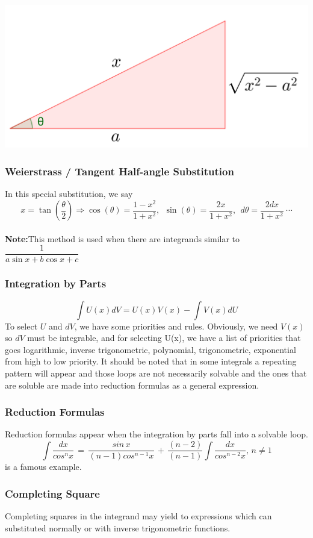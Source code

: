 \documentclass[12pt]{article}
\begin{document}
\begin{enumerate}
\includegraphics[scale=0.15]{asec_subs.png}
\end{enumerate}
\subsubsection{Weierstrass / Tangent Half-angle Substitution}
In this special substitution, we say $$x = \tan \left(\frac{\theta}{2}\right) \Rightarrow \cos (\theta )=\frac{1-x^2}{1+x^2} ,\ \  \sin (\theta ) = \frac{2x}{1+x^2} , \ \ d\theta = \frac{2dx}{1+x^2}\ \cdots$$ \\ \textbf{Note:}This method is used when there are integrands similar to $\dfrac{1}{a\sin x+b\cos x+c}$
\newpage
\subsubsection{Integration by Parts}
$$\int U(x) dV= U(x)V(x) - \int V(x) dU$$
To select $U$ and $dV$, we have some priorities and rules. Obviously, we need $V(x)$ so $dV$ must be integrable, and for selecting U(x), we have a list of priorities that goes logarithmic, inverse trigonometric, polynomial, trigonometric, exponential from high to low priority. It should be noted that in some integrals a repeating pattern will appear and those loops are not necessarily solvable and the ones that are soluble are made into reduction formulas as a general expression.
\subsubsection{Reduction Formulas}
Reduction formulas appear when the integration by parts fall into a solvable loop.
$$\int \frac{dx}{cos^n x}\,=\, \frac{sin\,x}{\left ( n-1 \right )cos^{n-1}x}\,+\,\frac{\left ( n-2 \right )}{\left ( n-1 \right )}\int \frac{dx}{cos^{n-2}x},\,n\neq1$$ is a famous example.
\subsubsection{Completing Square}
Completing squares in the integrand may yield to expressions which can substituted normally or with inverse trigonometric functions.
\end{document}
